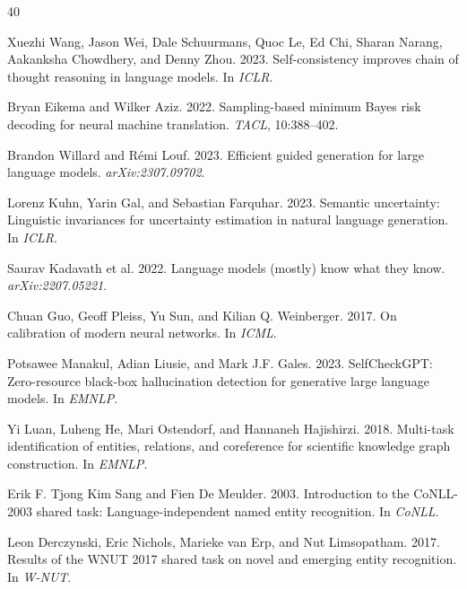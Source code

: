 \documentclass[11pt,a4paper]{article}
\begin{document}


\begin{thebibliography}{40}

Xuezhi Wang, Jason Wei, Dale Schuurmans, Quoc Le, Ed Chi, Sharan Narang, Aakanksha Chowdhery, and Denny Zhou. 2023.
Self-consistency improves chain of thought reasoning in language models.
In \emph{ICLR}.

Bryan Eikema and Wilker Aziz. 2022.
Sampling-based minimum Bayes risk decoding for neural machine translation.
\emph{TACL}, 10:388--402.

Brandon Willard and R\'{e}mi Louf. 2023.
Efficient guided generation for large language models.
\emph{arXiv:2307.09702}.

Lorenz Kuhn, Yarin Gal, and Sebastian Farquhar. 2023.
Semantic uncertainty: Linguistic invariances for uncertainty estimation in natural language generation.
In \emph{ICLR}.

Saurav Kadavath et al. 2022.
Language models (mostly) know what they know.
\emph{arXiv:2207.05221}.

Chuan Guo, Geoff Pleiss, Yu Sun, and Kilian Q. Weinberger. 2017.
On calibration of modern neural networks.
In \emph{ICML}.

Potsawee Manakul, Adian Liusie, and Mark J.F. Gales. 2023.
{SelfCheckGPT}: Zero-resource black-box hallucination detection for generative large language models.
In \emph{EMNLP}.

Yi Luan, Luheng He, Mari Ostendorf, and Hannaneh Hajishirzi. 2018.
Multi-task identification of entities, relations, and coreference for scientific knowledge graph construction.
In \emph{EMNLP}.

Erik F. Tjong Kim Sang and Fien De Meulder. 2003.
Introduction to the {CoNLL}-2003 shared task: Language-independent named entity recognition.
In \emph{CoNLL}.

Leon Derczynski, Eric Nichols, Marieke van Erp, and Nut Limsopatham. 2017.
Results of the {WNUT} 2017 shared task on novel and emerging entity recognition.
In \emph{W-NUT}.


\end{thebibliography}
\end{document}
